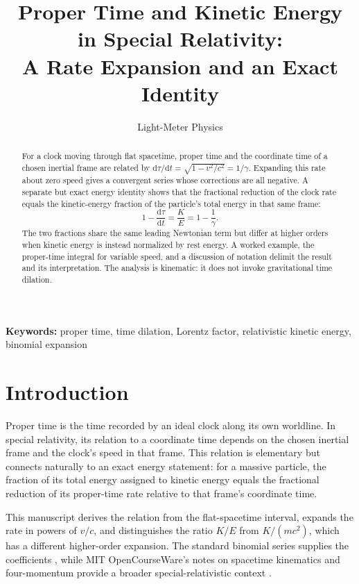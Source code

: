 \documentclass[12pt]{article}
\title{Proper Time and Kinetic Energy in Special Relativity:\\
A Rate Expansion and an Exact Identity}
\author{Light-Meter Physics}
\date{}
\begin{document}
\maketitle

\begin{abstract}
For a clock moving through flat spacetime, proper time and the coordinate time of a chosen inertial frame are related by $\mathrm{d}\tau/\mathrm{d}t=\sqrt{1-v^2/c^2}=1/\gamma$. Expanding this rate about zero speed gives a convergent series whose corrections are all negative. A separate but exact energy identity shows that the fractional reduction of the clock rate equals the kinetic-energy fraction of the particle's total energy in that same frame:
\begin{equation*}
1-\frac{\mathrm{d}\tau}{\mathrm{d}t}
=\frac{K}{E}
=1-\frac{1}{\gamma}.
\end{equation*}
The two fractions share the same leading Newtonian term but differ at higher orders when kinetic energy is instead normalized by rest energy. A worked example, the proper-time integral for variable speed, and a discussion of notation delimit the result and its interpretation. The analysis is kinematic: it does not invoke gravitational time dilation.
\end{abstract}

\noindent\textbf{Keywords:} proper time, time dilation, Lorentz factor, relativistic kinetic energy, binomial expansion

\section{Introduction}

Proper time is the time recorded by an ideal clock along its own worldline. In special relativity, its relation to a coordinate time depends on the chosen inertial frame and the clock's speed in that frame. This relation is elementary but connects naturally to an exact energy statement: for a massive particle, the fraction of its total energy assigned to kinetic energy equals the fractional reduction of its proper-time rate relative to that frame's coordinate time.

This manuscript derives the relation from the flat-spacetime interval, expands the rate in powers of $v/c$, and distinguishes the ratio $K/E$ from $K/(mc^2)$, which has a different higher-order expansion. The standard binomial series supplies the coefficients \cite{DLMF}, while MIT OpenCourseWare's notes on spacetime kinematics and four-momentum provide a broader special-relativistic context \cite{Hughes2024}.
\end{document}

